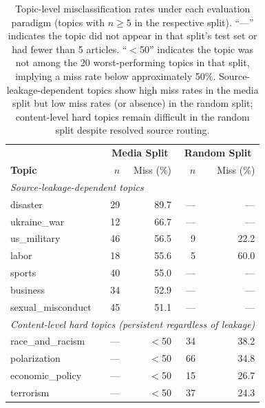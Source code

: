 \begin{table}[ht]
\centering
\small
\begin{tabular}{lrrrr}
\toprule
 & \multicolumn{2}{c}{\textbf{Media Split}} & \multicolumn{2}{c}{\textbf{Random Split}} \\
\textbf{Topic} & $n$ & Miss (\%) & $n$ & Miss (\%) \\
\midrule
\multicolumn{5}{l}{\textit{Source-leakage-dependent topics}} \\
disaster            & 29 & 89.7 & --- & --- \\
ukraine\_war        & 12 & 66.7 & --- & --- \\
us\_military        & 46 & 56.5 & 9   & 22.2 \\
labor               & 18 & 55.6 & 5   & 60.0 \\
sports              & 40 & 55.0 & --- & --- \\
business            & 34 & 52.9 & --- & --- \\
sexual\_misconduct  & 45 & 51.1 & --- & --- \\
\midrule
\multicolumn{5}{l}{\textit{Content-level hard topics (persistent regardless of leakage)}} \\
race\_and\_racism   & --- & $<$50 & 34 & 38.2 \\
polarization        & --- & $<$50 & 66 & 34.8 \\
economic\_policy    & --- & $<$50 & 15 & 26.7 \\
terrorism           & --- & $<$50 & 37 & 24.3 \\
\bottomrule
\end{tabular}
\caption{Topic-level misclassification rates under each evaluation paradigm (topics with $n \geq 5$ in the respective split). ``---'' indicates the topic did not appear in that split's test set or had fewer than 5 articles. ``$<$50'' indicates the topic was not among the 20 worst-performing topics in that split, implying a miss rate below approximately 50\%. Source-leakage-dependent topics show high miss rates in the media split but low miss rates (or absence) in the random split; content-level hard topics remain difficult in the random split despite resolved source routing.}
\label{tab:topic_leakage}
\end{table}
